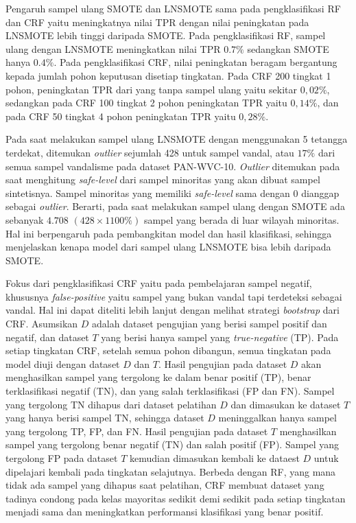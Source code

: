 Pengaruh sampel ulang SMOTE dan LNSMOTE sama pada pengklasifikasi RF dan CRF
yaitu meningkatnya nilai TPR dengan nilai peningkatan pada LNSMOTE lebih tinggi
daripada SMOTE.
Pada pengklasifikasi RF, sampel ulang dengan LNSMOTE meningkatkan nilai TPR
$0.7\%$ sedangkan SMOTE hanya $0.4\%$.
Pada pengklasifikasi CRF, nilai peningkatan beragam bergantung kepada jumlah
pohon keputusan disetiap tingkatan.
Pada CRF 200 tingkat 1 pohon, peningkatan TPR dari yang tanpa sampel ulang
yaitu sekitar $0,02\%$, sedangkan pada CRF 100 tingkat 2 pohon peningkatan TPR
yaitu $0,14\%$, dan pada CRF 50 tingkat 4 pohon peningkatan TPR yaitu $0,28\%$.


Pada saat melakukan sampel ulang LNSMOTE dengan menggunakan 5 tetangga
terdekat, ditemukan \textit{outlier} sejumlah 428 untuk sampel vandal, atau
$17\%$ dari semua sampel vandalisme pada dataset PAN-WVC-10.
\textit{Outlier} ditemukan pada saat menghitung \textit{safe-level} dari sampel
minoritas yang akan dibuat sampel sintetisnya.
Sampel minoritas yang memiliki \textit{safe-level} sama dengan  $ 0 $
dianggap sebagai \textit{outlier}.
Berarti, pada saat melakukan sampel ulang dengan SMOTE ada sebanyak
$ 4.708 $ $ (428 \times 1100\%) $
sampel yang berada di luar wilayah minoritas.
Hal ini berpengaruh pada pembangkitan model dan hasil klasifikasi, sehingga
menjelaskan kenapa model dari sampel ulang LNSMOTE bisa lebih daripada SMOTE.


Fokus dari pengklasifikasi CRF yaitu pada pembelajaran sampel negatif,
khususnya \textit{false-positive} yaitu sampel yang bukan vandal tapi
terdeteksi sebagai vandal.
Hal ini dapat diteliti lebih lanjut dengan melihat strategi \textit{bootstrap}
dari CRF.
Asumsikan $D$ adalah dataset pengujian yang berisi sampel positif dan negatif,
dan dataset $T$ yang berisi hanya sampel yang \textit{true-negative} (TP).
Pada setiap tingkatan CRF, setelah semua pohon dibangun, semua tingkatan pada
model diuji dengan dataset $D$ dan $T$.
Hasil pengujian pada dataset $D$ akan menghasilkan sampel yang tergolong ke
dalam benar positif (TP), benar terklasifikasi negatif (TN), dan yang salah
terklasifikasi (FP dan FN).
Sampel yang tergolong TN dihapus dari dataset pelatihan $D$ dan dimasukan ke
dataset $T$ yang hanya berisi sampel TN, sehingga dataset $D$ meninggalkan
hanya sampel yang tergolong TP, FP, dan FN.
Hasil pengujian pada dataset $T$ menghasilkan sampel yang tergolong benar
negatif (TN) dan salah positif (FP).
Sampel yang tergolong FP pada dataset $T$ kemudian dimasukan kembali ke dataest
$D$ untuk dipelajari kembali pada tingkatan selajutnya.
Berbeda dengan RF, yang mana tidak ada sampel yang dihapus saat
pelatihan, CRF membuat dataset yang tadinya condong pada kelas mayoritas
sedikit demi sedikit pada setiap tingkatan menjadi sama dan meningkatkan
performansi klasifikasi yang benar positif.

